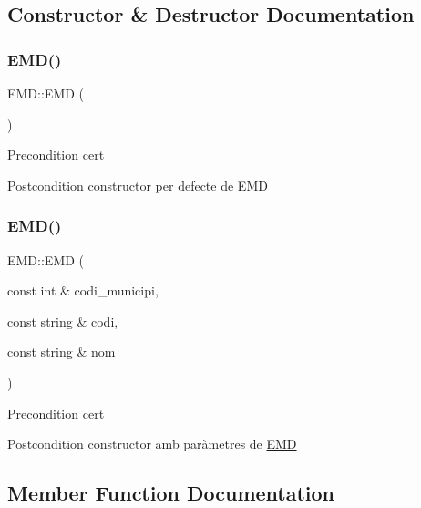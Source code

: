 \subsection{Constructor \& Destructor Documentation}
\mbox{\label{classEMD_a1b23820b6cb96bf647c2d61ad2651225}} 
\subsubsection{\texorpdfstring{E\+M\+D()}{EMD()}\hspace{0.1cm}{\footnotesize\ttfamily [1/2]}}
{\footnotesize\ttfamily E\+M\+D\+::\+E\+MD (\begin{DoxyParamCaption}{ }\end{DoxyParamCaption})}

\begin{DoxyPrecond}{Precondition}
cert 
\end{DoxyPrecond}
\begin{DoxyPostcond}{Postcondition}
constructor per defecte de \hyperlink{classEMD}{E\+MD} 
\end{DoxyPostcond}
\mbox{\label{classEMD_ab77285f553e7476e81c119a229a472a6}} 
\subsubsection{\texorpdfstring{E\+M\+D()}{EMD()}\hspace{0.1cm}{\footnotesize\ttfamily [2/2]}}
{\footnotesize\ttfamily E\+M\+D\+::\+E\+MD (\begin{DoxyParamCaption}\item[{const int \&}]{codi\+\_\+municipi,  }\item[{const string \&}]{codi,  }\item[{const string \&}]{nom }\end{DoxyParamCaption})}

\begin{DoxyPrecond}{Precondition}
cert 
\end{DoxyPrecond}
\begin{DoxyPostcond}{Postcondition}
constructor amb paràmetres de \hyperlink{classEMD}{E\+MD} 
\end{DoxyPostcond}


\subsection{Member Function Documentation}
\mbox{\label{classEMD_ae34a435b49ffbc76b550dbeb6260e183}} 

